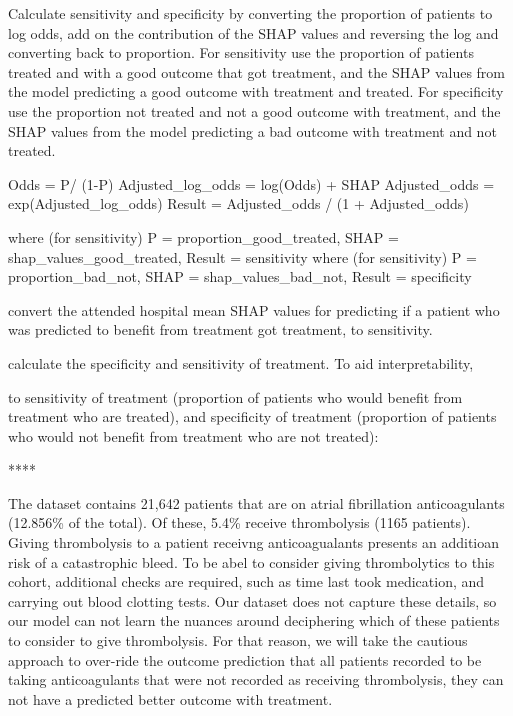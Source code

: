 Calculate sensitivity and specificity by converting the proportion of patients to log odds, add on the contribution of the SHAP values and reversing the log and converting back to proportion.  For sensitivity use the proportion of patients treated and with a good outcome that got treatment, and the SHAP values from the model predicting a good outcome with treatment and treated. For specificity use the proportion not treated and not a good outcome with treatment, and the SHAP values from the model predicting a bad outcome with treatment and not treated.

    Odds = P/ (1-P)
    Adjusted\_log\_odds = log(Odds) + SHAP
    Adjusted\_odds = exp(Adjusted\_log\_odds)
    Result = Adjusted\_odds / (1 + Adjusted\_odds)


    where (for sensitivity) P = proportion\_good\_treated, SHAP = shap\_values\_good\_treated, Result = sensitivity
    where (for sensitivity) P = proportion\_bad\_not, SHAP = shap\_values\_bad\_not, Result = specificity



convert the attended hospital mean SHAP values for predicting if a patient who was predicted to benefit from treatment got treatment, to sensitivity. 

calculate the specificity and sensitivity of treatment. To aid interpretability, 

to sensitivity of treatment (proportion of patients who would benefit from treatment who are treated), and specificity of treatment (proportion of patients who would not benefit from treatment who are not treated):


****

The dataset contains 21,642 patients that are on atrial fibrillation anticoagulants (12.856\% of the total). Of these, 5.4\% receive thrombolysis (1165 patients). Giving thrombolysis to a patient receivng anticoagualants presents an additioan risk of a catastrophic bleed. To be abel to consider giving thrombolytics to this cohort, additional checks are required, such as time last took medication, and carrying out blood clotting tests. Our dataset does not capture these details, so our model can not learn the nuances around deciphering which of these patients to consider to give thrombolysis. For that reason, we will take the cautious approach to over-ride the outcome prediction that all patients recorded to be taking anticoagulants that were not recorded as receiving thrombolysis, they can not have a predicted better outcome with treatment.


